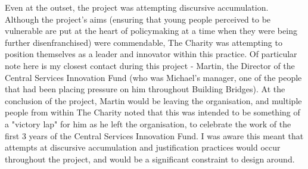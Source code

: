 Even at the outset, the project was attempting discursive accumulation. Although the project's aims (ensuring that young people perceived to be vulnerable are put at the heart of policymaking at a time when they were being further disenfranchised) were commendable, The Charity was attempting to position themselves as a leader and innovator within this practice. Of particular note here is my closest contact during this project - Martin, the Director of the Central Services Innovation Fund (who was Michael's manager, one of the people that had been placing pressure on him throughout Building Bridges). At the conclusion of the project, Martin would be leaving the organisation, and multiple people from within The Charity noted that this was intended to be something of a "victory lap" for him as he left the organisation, to celebrate the work of the first 3 years of the Central Services Innovation Fund. I was aware this meant that attempts at discursive accumulation and justification practices would occur throughout the project, and would be a significant constraint to design around. 

